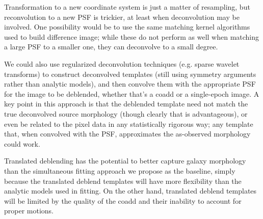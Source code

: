 \documentclass[10pt]{article}
\begin{document}
Transformation to a new coordinate system is just a matter of resampling, but
reconvolution to a new PSF is trickier, at least when deconvolution may be
involved.  One possibility would be to use the same matching kernel algorithms
used to build difference image; while these do not perform as well when
matching a large PSF to a smaller one, they can deconvolve to a small degree.

We could also use regularized deconvolution techniques (e.g. sparse wavelet
transforms) to construct deconvolved templates (still using symmetry arguments
rather than analytic models), and then convolve them with the appropriate PSF
for the image to be deblended, whether that's a coadd or a single-epoch image.
A key point in this approach is that the deblended template need not match the
true deconvolved source morphology (though clearly that is advantageous), or
even be related to the pixel data in any statistically rigorous way; any
template that, when convolved with the PSF, approximates the as-observed
morphology could work.

Translated deblending has the potential to better capture galaxy morphology
than the simultaneous fitting approach we propose as the baseline, simply
because the translated deblend templates will have more flexibility than the
analytic models used in fitting.  On the other hand, translated deblend
templates will be limited by the quality of the coadd and their inability to
account for proper motions.
\end{document}
